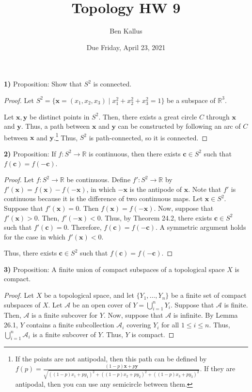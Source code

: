 \documentclass[12pt]{report}
\title{Topology HW 9}
\author{Ben Kallus}
\date{Due Friday, April 23, 2021}
\begin{document}
\maketitle

\medskip\noindent\textbf{1)} Proposition: Show that $S^2$ is connected.
\begin{proof}
    Let $S^2 = \{\mathbf x = (x_1, x_2, x_3) \mid x_1^2 + x_2^2 + x_3^2 = 1\}$ be a subspace of $\mathbb R^3$.
    
    Let $\mathbf x, \mathbf y$ be distinct points in $S^2$.
    Then, there exists a great circle $C$ through $\mathbf x$ and $\mathbf y$.
    Thus, a path between $\mathbf x$ and $\mathbf y$ can be constructed by following an arc of $C$ between $\mathbf x$ and $\mathbf y$.\footnote{If the points are not antipodal, then this path can be defined by $f(p) = \frac{(1-p)\mathbf x + p \mathbf y}{\sqrt{((1-p)x_1 + py_1)^2 + ((1-p)x_2 + py_2)^2 + ((1-p)x_3 + py_3)^2}}$. If they are antipodal, then you can use any semicircle between them.}
    Thus, $S^2$ is path-connected, so it is connected.
\end{proof}

\newpage\noindent\textbf{2)} Proposition: If $f: S^2 \to \mathbb R$ is continuous, then there exists $\mathbf c \in S^2$ such that $f(\mathbf c) = f(-\mathbf c)$.
\begin{proof}
    Let $f: S^2 \to \mathbb R$ be continuous.
    Define $f': S^2 \to \mathbb R$ by $f'(\mathbf x) = f(\mathbf x) - f(-\mathbf x)$, in which $- \mathbf x$ is the antipode of $\mathbf x$.
    Note that $f'$ is continuous because it is the difference of two continuous maps.
    Let $\mathbf x \in S^2$.
    Suppose that $f'(\mathbf x) = 0$.
    Then $f(\mathbf x) = f(-\mathbf x)$.
    Now, suppose that $f'( \mathbf x) > 0$.
    Then, $f'(-\mathbf x) < 0$.
    Thus, by Theorem 24.2, there exists $\mathbf c \in S^2$ such that $f'(\mathbf c) = 0$.
    Therefore, $f(\mathbf c) = f(-\mathbf c)$.
    A symmetric argument holds for the case in which $f'(\mathbf x) < 0$.

    Thus, there exists $\mathbf c \in S^2$ such that $f(\mathbf c) = f(-\mathbf c)$.
\end{proof}

\newpage\noindent\textbf{3)} Proposition: A finite union of compact subspaces of a topological space $X$ is compact.
\begin{proof}
    Let $X$ be a topological space, and let $\{Y_1, \hdots, Y_n\}$ be a finite set of compact subspaces of $X$.
    Let $\mathcal A$ be an open cover of $Y = \bigcup_{i=1}^n Y_i$.
    Suppose that $\mathcal A$ is finite.
    Then, $\mathcal A$ is a finite subcover for $Y$.
    Now, suppose that $\mathcal A$ is infinite.
    By Lemma 26.1, $Y$ contains a finite subcollection $\mathcal A_i$ covering $Y_i$ for all $1 \leq i \leq n$.
    Thus, $\bigcup_{i=1}^n \mathcal A_i$ is a finite subcover of $Y$.
    Thus, $Y$ is compact.
\end{proof}
\end{document}

